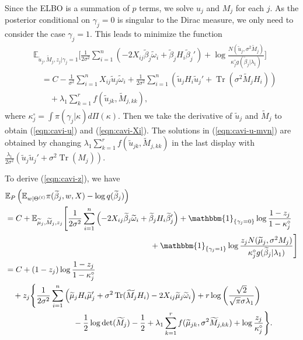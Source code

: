 \documentclass[pdftex, noinfoline, letter]{imsart}
\DeclareMathOperator{\Tr}{Tr}
\theoremstyle{plain}
\begin{document}
Since the ELBO is a summation of $p$ terms, we solve $u_j$ and $M_j$ for each $j$. 
As the posterior conditional on $\gamma_j =0$ is singular to the Dirac measure, we only need to consider the case $\gamma_j = 1$. This leads to minimize the function
\begin{align*}
    & \mathbb{E}_{\widetilde  u_j, \widetilde M_j, z_j|\gamma_j = 1}\Bigg[
      \frac{1}{2\sigma^2} \sum_{i=1}^n 
      \left(
        - 2X_{ij} \widetilde \beta_j \widetilde  \omega_i + \widetilde \beta_j H_i \widetilde \beta_j' 
      \right)
      + \log \frac{N(\widetilde  u_j, \sigma^2 \widetilde  M_j)}{\kappa_j^\circ g( \widetilde  \beta_j|\lambda_1)}
    \Bigg]\\
    & \quad = C
    - \frac{1}{\sigma^2} \sum_{i=1}^n X_{ij} \widetilde  u_j \widetilde  \omega_i
    + \frac{1}{2\sigma^2} \sum_{i=1}^n \left(
        \widetilde  u_j H_i \widetilde  u_j'
        + \Tr\left(\sigma^2\widetilde  M_jH_i\right)
    \right)\\
    &\quad\quad+ \lambda_1 \sum_{k=1}^r f(\widetilde  u_{jk}, \widetilde  M_{j,kk}),
\end{align*}
where $\kappa_j^\circ = \int \pi(\gamma_j|\kappa) d\Pi(\kappa)$. Then
we take the derivative of $\widetilde  u_j$ and $\widetilde  M_j$ to obtain (\ref{eqn:cavi-u}) and (\ref{eqn:cavi-Xi}).
The solutions in (\ref{eqn:cavi-u-mvn}) are obtained by changing 
$\lambda_1 \sum_{k=1}^r f(\widetilde  u_{jk}, \widetilde  M_{j,kk})$ in the last display with 
$\frac{\lambda_1}{2\sigma^2} \left(\widetilde  u_j \widetilde  u_j' + \sigma^2 \Tr(M_j)\right)$.


To derive (\ref{eqn:cavi-z}), we have  
\begin{align}
&\mathbb{E}_P \left(\mathbb{E}_{w|\Theta^{(t)}} 
\pi(\widetilde  \beta_j, w, X) - \log q(\widetilde  \beta_j)
\right) \nonumber \\
    & = C + \mathbb{E}_{\widetilde  \mu_j, \widetilde  M_j, z_j}
    \Bigg[
     \frac{1}{2\sigma^2} \sum_{i=1}^n 
      \left(
        -2X_{ij} \widetilde  \beta_j \widetilde  \omega_i + \widetilde  \beta_j H_i \widetilde  \beta_j' 
      \right)  + \mathbbm{1}_{\{\gamma_j = 0\}}\log \frac{1 - z_j}{1-\kappa_j^\circ}
     \nonumber\\
    &  \hspace{6.4cm}
    + \mathbbm{1}_{\{\gamma_j = 1\}}\log \frac{z_j N(\widetilde \mu_j, \sigma^2 M_j)}{\kappa_j^\circ g(\widetilde  \beta_j|\lambda_1)} 
    \Bigg]\nonumber\\
    & = C+ (1-z_j) \log \frac{1-z_j}{1-\kappa_j^\circ}\label{eqn:display-1}\\
    &\quad +z_j
    \Bigg\{
    \frac{1}{2\sigma^2} \sum_{i=1}^n 
    \left(
        \widetilde \mu_j H_i \widetilde \mu_j'
        +\sigma^2 \Tr(\widetilde M_j H_i)
        - 2X_{ij} \widetilde \mu_j \widetilde  \omega_i
    \right)+ r\log \left(\frac{\sqrt{2}}{\sqrt{\pi} \sigma \lambda_1}\right)
       \nonumber\\
    & \hspace{3cm}        
      - \frac{1}{2}\log \det(\widetilde M_j) - \frac{1}{2}+ \lambda_1 \sum_{k=1}^r
    f(\widetilde \mu_{jk},\sigma^2 \widetilde M_{j,kk})
    + \log \frac{z_j}{\kappa_j^\circ}
    \Bigg\}.\nonumber
\end{align}
%
\end{document}
